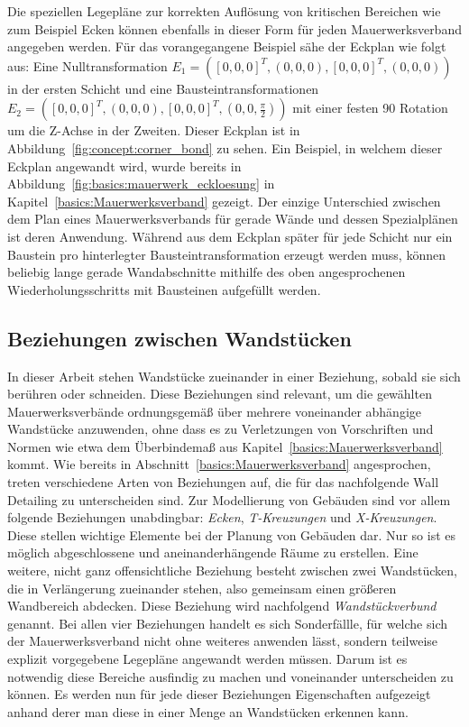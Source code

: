 Die speziellen Legepläne zur korrekten Auflösung von kritischen Bereichen wie zum Beispiel Ecken können ebenfalls in dieser Form für jeden Mauerwerksverband angegeben werden.
Für das vorangegangene Beispiel sähe der Eckplan wie folgt aus:
Eine Nulltransformation \(E_1 = ({[0, 0, 0]}^T, (0, 0, 0), {[0, 0, 0]}^T, (0, 0, 0))\) in der ersten Schicht und eine Bausteintransformationen 
\(E_2 = ({[0, 0, 0]}^T, (0, 0, 0), {[0, 0, 0]}^T, (0, 0, \frac{\pi}{2}))\) mit einer festen 90\degree{} Rotation um die Z-Achse in der Zweiten.
Dieser Eckplan ist in Abbildung~\ref{fig:concept:corner_bond} zu sehen.
Ein Beispiel, in welchem dieser Eckplan angewandt wird, wurde bereits in Abbildung~\ref{fig:basics:mauerwerk_eckloesung} in Kapitel~\ref{basics:Mauerwerksverband} gezeigt.
Der einzige Unterschied zwischen dem Plan eines Mauerwerksverbands für gerade Wände und dessen Spezialplänen ist deren Anwendung.
Während aus dem Eckplan später für jede Schicht nur ein Baustein pro hinterlegter Bausteintransformation erzeugt werden muss, können beliebig lange gerade Wandabschnitte mithilfe des oben angesprochenen Wiederholungsschritts mit Bausteinen aufgefüllt werden.

\subsection{Beziehungen zwischen Wandstücken}\label{concept:relations_wandtuecke}
In dieser Arbeit stehen Wandstücke zueinander in einer Beziehung, sobald sie sich berühren oder schneiden.
Diese Beziehungen sind relevant, um die gewählten Mauerwerksverbände ordnungsgemäß über mehrere voneinander abhängige Wandstücke anzuwenden, ohne dass es zu Verletzungen von Vorschriften und Normen wie etwa dem Überbindemaß aus Kapitel~\ref{basics:Mauerwerksverband} kommt.
Wie bereits in Abschnitt~\ref{basics:Mauerwerksverband} angesprochen, treten verschiedene Arten von Beziehungen auf, die für das nachfolgende \glqq{}Wall Detailing\grqq{} zu unterscheiden sind.
Zur Modellierung von Gebäuden sind vor allem folgende Beziehungen unabdingbar:
\textit{Ecken}, \textit{T-Kreuzungen} und \textit{X-Kreuzungen}.
Diese stellen wichtige Elemente bei der Planung von Gebäuden dar. 
Nur so ist es möglich abgeschlossene und aneinanderhängende Räume zu erstellen.
Eine weitere, nicht ganz offensichtliche Beziehung besteht zwischen zwei Wandstücken, die in Verlängerung zueinander stehen, also gemeinsam einen größeren Wandbereich abdecken.
Diese Beziehung wird nachfolgend \textit{Wandstückverbund} genannt.
Bei allen vier Beziehungen handelt es sich Sonderfällle, für welche sich der Mauerwerksverband nicht ohne weiteres anwenden lässt, sondern teilweise explizit vorgegebene Legepläne angewandt werden müssen.
Darum ist es notwendig diese Bereiche ausfindig zu machen und voneinander unterscheiden zu können.
Es werden nun für jede dieser Beziehungen Eigenschaften aufgezeigt anhand derer man diese in einer Menge an Wandstücken erkennen kann.

